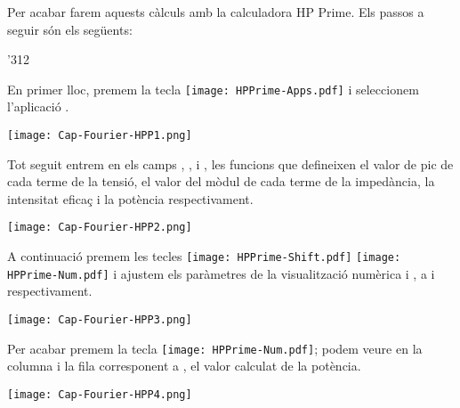 \begin{exemple}
    \hspace{1cm}

    \hspace{1cm}

    \hspace{1cm}

    \hspace{1cm}

    \hspace{1cm}

    \hspace{1cm}\newline


    Per acabar farem aquests càlculs amb la calculadora \textsf{HP Prime}.
     Els passos a seguir són els següents:

    \begin{dingautolist}{'312}

        \item En primer lloc, premem la tecla \texttt{[image: HPPrime-Apps.pdf]} i seleccionem l'aplicació .

             \texttt{[image: Cap-Fourier-HPP1.png]}

        \item Tot seguit entrem en els camps , ,  i , les funcions que defineixen el valor de pic de cada terme de la tensió,  el valor del mòdul de cada terme de la impedància,  la intensitat eficaç i la potència respectivament.

            \texttt{[image: Cap-Fourier-HPP2.png]}

        \item  A continuació premem les tecles \texttt{[image: HPPrime-Shift.pdf]} \texttt{[image: HPPrime-Num.pdf]} i ajustem els paràmetres de la visualització numèrica  i , a  i  respectivament.

            \texttt{[image: Cap-Fourier-HPP3.png]}

        \item Per acabar premem la tecla \texttt{[image: HPPrime-Num.pdf]}; podem veure en la columna  i la fila corresponent a , el valor calculat de la potència.

            \texttt{[image: Cap-Fourier-HPP4.png]}


\end{dingautolist}
\end{exemple}
